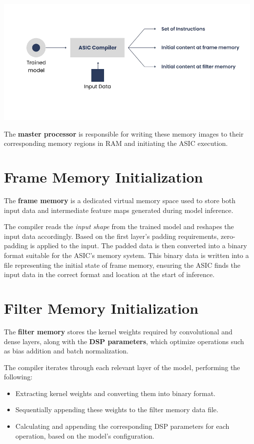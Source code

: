 \documentclass[12pt]{report}
\begin{document}
\includegraphics[width=\textwidth]{asic_dnn_compiler1.png}


The \textbf{master processor} is responsible for writing these memory images to their corresponding memory regions in RAM and initiating the ASIC execution.

\section{Frame Memory Initialization}

The \textbf{frame memory} is a dedicated virtual memory space used to store both input data and intermediate feature maps generated during model inference. 

The compiler reads the \textit{input shape} from the trained model and reshapes the input data accordingly. Based on the first layer’s padding requirements, zero-padding is applied to the input. The padded data is then converted into a binary format suitable for the ASIC’s memory system. This binary data is written into a file representing the initial state of frame memory, ensuring the ASIC finds the input data in the correct format and location at the start of inference.

\section{Filter Memory Initialization}

The \textbf{filter memory} stores the kernel weights required by convolutional and dense layers, along with the \textbf{DSP parameters}, which optimize operations such as bias addition and batch normalization.

The compiler iterates through each relevant layer of the model, performing the following:
\begin{itemize}
    \item Extracting kernel weights and converting them into binary format.
    \item Sequentially appending these weights to the filter memory data file.
    \item Calculating and appending the corresponding DSP parameters for each operation, based on the model’s configuration.
\end{itemize}
\end{document}
